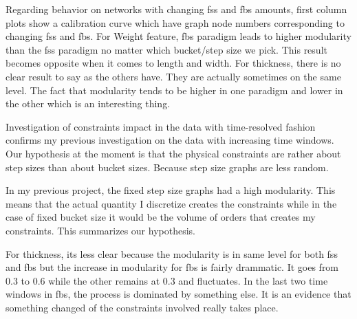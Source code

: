 

{\color{red}
	Regarding behavior on networks with changing fss and fbs amounts, first column plots show a calibration curve which have graph node numbers corresponding to changing fss and fbs. For Weight feature, fbs paradigm leads to higher modularity than the fss paradigm no matter which bucket/step size we pick. This result becomes opposite when it comes to length and width. For thickness, there is no clear result to say as the others have. They are actually sometimes on the same level. The fact that modularity tends to be higher in one paradigm and lower in the other which is an interesting thing.
	
	Investigation of constraints impact in the data with time-resolved fashion confirms my previous investigation on the data with increasing time windows. 
	Our hypothesis at the moment is that the physical constraints are rather about step sizes than about bucket sizes. Because step size graphs are less random.
	
	In my previous project, the fixed step size graphs had a high modularity. This means that the actual quantity I discretize creates the constraints while in the case of fixed bucket size it would be the volume of orders that creates my constraints. This summarizes our hypothesis. 
	
	
	For thickness, its less clear because the modularity is in same level for both fss and fbs but the increase in modularity for fbs is fairly drammatic. It goes from 0.3 to 0.6 while the other remains at 0.3 and fluctuates. In the last two time windows in fbs, the process is dominated by something else. It is an evidence that something changed of the constraints involved really takes place.
	
	
}
